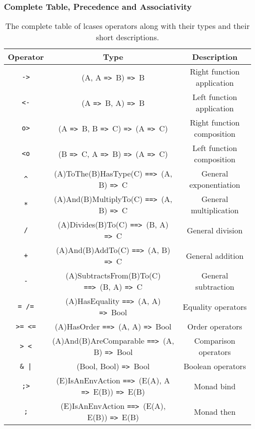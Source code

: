 \documentclass{article}
\def\ra{\texttt{=>}\ }
\def\Ra{\texttt{==>}\ }
\begin{document}
\subsubsection{Complete Table, Precedence and Associativity}
\begin{table}[h!]

\caption{
The complete table of lcases operators along with their types and 
their short descriptions.
}

\begin{center}
\begin{tabular}{ |c|c|c| } 
\hline
Operator & Type & Description \\ 
\hline
\hline
\texttt{->} & (A, A \ra B) \ra B & Right function application \\
\hline
\texttt{<-} & (A \ra B, A) \ra B & Left function application \\
\hline
\texttt{o>} & (A \ra B, B \ra C) \ra (A \ra C) & Right function composition \\
\hline
\texttt{<o} & (B \ra C, A \ra B) \ra (A \ra C) & Left function composition \\
\hline
\texttt{\^} & (A)ToThe(B)HasType(C) \Ra (A, B) \ra C & General exponentiation  \\
\hline
\texttt{*} & (A)And(B)MultiplyTo(C) \Ra (A, B) \ra C & General multiplication  \\
\hline
\texttt{/} & (A)Divides(B)To(C) \Ra (B, A) \ra C & General division \\
\hline
\texttt{+} & (A)And(B)AddTo(C) \Ra (A, B) \ra C & General addition \\ 
\hline
\texttt{-} & (A)SubtractsFrom(B)To(C) \Ra (B, A) \ra C & General subtraction \\
\hline
\texttt{= /=} & (A)HasEquality \Ra (A, A) \ra Bool & Equality operators \\
\hline
\texttt{>= <=} & (A)HasOrder \Ra (A, A) \ra Bool & Order operators \\
\hline
\texttt{> <} & (A)And(B)AreComparable \Ra (A, B) \ra Bool & Comparison operators\\
\hline
\texttt{\& |} & (Bool, Bool) \ra Bool & Boolean operators \\
\hline
\texttt{;>} & (E)IsAnEnvAction \Ra (E(A), A \ra E(B)) \ra E(B) &
Monad bind \\
\hline
\texttt{;} & (E)IsAnEnvAction \Ra (E(A), E(B)) \ra E(B) &
Monad then \\
\hline
\end{tabular}
\end{center}

\label{table:allops}

\end{table}\mbox{}\\
\end{document}
